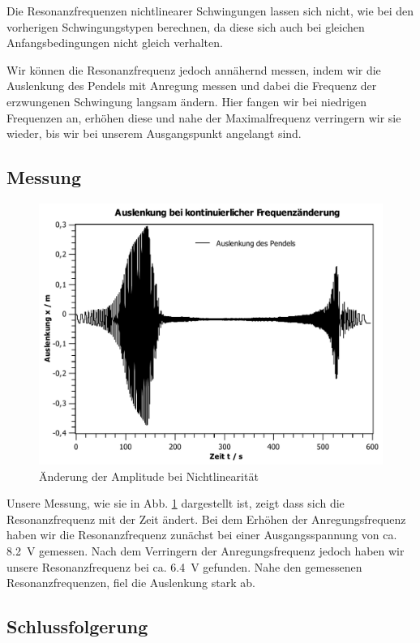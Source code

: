 \documentclass[11pt,a4paper,titlepage, ngerman]{article}
\newcommand{\refabb}[1]{Abb. \ref{abb:#1}}
\begin{document}
			Die Resonanzfrequenzen nichtlinearer Schwingungen lassen sich nicht, wie bei den vorherigen Schwingungstypen berechnen, da diese sich auch bei gleichen Anfangsbedingungen nicht gleich verhalten.
			
			Wir können die Resonanzfrequenz jedoch annähernd messen, indem wir die Auslenkung des Pendels mit Anregung messen und dabei die Frequenz der erzwungenen Schwingung langsam ändern.
			Hier fangen wir bei niedrigen Frequenzen an, erhöhen diese und nahe der Maximalfrequenz verringern wir sie wieder, bis wir bei unserem Ausgangspunkt angelangt sind.
		
		\subsection*{Messung}
			
			\begin{figure}[ht]
				\includegraphics[width=\textwidth]{Frequenzaenderung.pdf}
				\caption{Änderung der Amplitude bei Nichtlinearität}
				\label{abb:Nichtlinearität}
			\end{figure}
			Unsere Messung, wie sie in \refabb{Nichtlinearität} dargestellt ist, zeigt dass sich die Resonanzfrequenz mit der Zeit ändert. Bei dem Erhöhen der Anregungsfrequenz haben wir die Resonanzfrequenz zunächst bei einer Ausgangsspannung von ca. \SI{8,2}{\V} gemessen. Nach dem Verringern der Anregungsfrequenz jedoch haben wir unsere Resonanzfrequenz bei ca. \SI{6,4}{\V} gefunden. Nahe den gemessenen Resonanzfrequenzen, fiel die Auslenkung stark ab.
			
		\subsection*{Schlussfolgerung}
			
\end{document}
